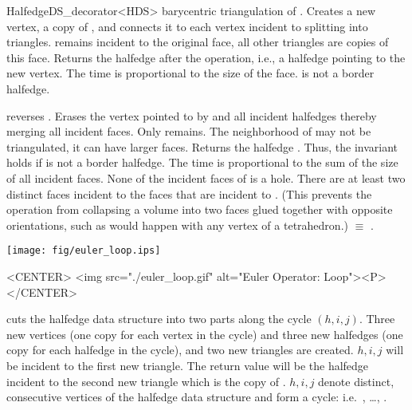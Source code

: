 \begin{ccRefClass}{HalfedgeDS_decorator<HDS>}
    {barycentric triangulation of . Creates a new vertex,
     a copy of , and connects it to each vertex incident 
     to  splitting  into triangles. 
      remains incident to the original face, all other triangles 
     are copies of this face. Returns the halfedge 
     after the operation, i.e., a halfedge pointing to the new vertex. 
     The time is proportional to the size of the face.
     \ccPrecond {} is not a border halfedge.}

    {reverses . Erases the
     vertex pointed to by  and all incident halfedges thereby
     merging all incident faces. Only  remains. 
     The neighborhood of  may not be triangulated,
     it can have larger faces. Returns the halfedge .
     Thus, the invariant  holds if  is not a border halfedge.
     The time is proportional to the sum of the size of all incident faces.
     \ccPrecond None of the incident faces of  is 
     a hole. There are at least two distinct faces incident
     to the faces that are incident to . (This 
     prevents the operation from collapsing a volume into two faces
     glued together with opposite orientations, such as would
     happen with any vertex of a tetrahedron.)
      $\equiv$ .}

\newpage

\begin{ccTexOnly}
    \begin{center}
      \parbox{0.636\textwidth}{%
          \texttt{[image: fig/euler\_loop.ips]}%
      }
    \end{center}
\end{ccTexOnly}

\begin{ccHtmlOnly}
    <CENTER>
    <img src="./euler_loop.gif" alt="Euler Operator: Loop"><P>
    </CENTER>
\end{ccHtmlOnly}

   {cuts the halfedge data structure into two parts along the cycle $(h,i,j)$.
    Three new vertices (one copy for each vertex in the cycle) and three 
    new halfedges (one copy for each halfedge in the cycle), and two new 
    triangles are created. $h,i,j$ will be incident to the first new triangle.
    The return value will be the halfedge incident to the second new triangle 
    which is the copy of .
    \ccPrecond $h,i,j$ denote distinct, consecutive vertices of the
    halfedge data structure and form a cycle: i.e.~, \ldots, .}


\end{ccRefClass}
